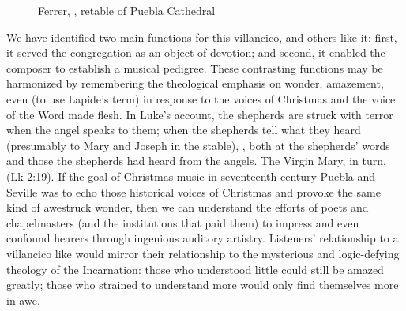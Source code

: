 \begin{figure}
    \caption{Ferrer, , retable of Puebla
    Cathedral}

    \label{fig:Puebla-Ferrer-Pastores}

\end{figure}

We have identified two main functions for this villancico, and others like it:
first, it served the congregation as an object of devotion; and second, it
enabled the composer to establish a musical pedigree.
These contrasting functions may be harmonized by remembering the theological
emphasis on wonder, amazement, even  (to use Lapide's term)
in response to the voices of Christmas and the voice of the Word made flesh.
In Luke's account, the shepherds are struck with terror when the angel speaks to
them; when the shepherds tell what they heard (presumably to Mary and Joseph in
the stable), , both at the shepherds' words
and those the shepherds had heard from the angels.
The Virgin Mary, in turn,  (Lk 2:19).
If the goal of Christmas music in seventeenth-century Puebla and Seville was to
echo those historical voices of Christmas and provoke the same kind of awestruck
wonder, then we can understand the efforts of poets and chapelmasters (and the
institutions that paid them) to impress and even confound hearers through
ingenious auditory artistry.
Listeners' relationship to a villancico like 
would mirror their relationship to the mysterious and logic-defying theology of
the Incarnation: those who understood little could still be amazed greatly;
those who strained to understand more would only find themselves more in awe.

\endinput
